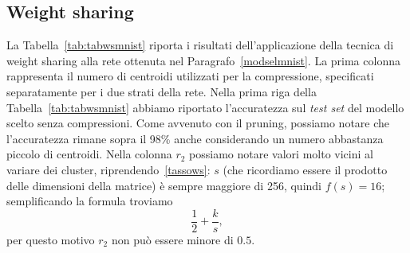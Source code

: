 \documentclass[11pt,a4paper,twoside,
openright]{book}
\begin{document}
\subsection{Weight sharing}
La Tabella~\ref{tab:tabwsmnist} riporta i risultati dell'applicazione della tecnica di weight sharing alla rete ottenuta nel Paragrafo~\ref{modselmnist}. La prima colonna rappresenta il numero di centroidi utilizzati per la compressione, specificati separatamente per i due strati della rete. Nella prima riga della Tabella~\ref{tab:tabwsmnist} abbiamo riportato l'accuratezza sul \textit{test set} del modello scelto senza compressioni. Come avvenuto con il pruning, possiamo notare che l'accuratezza rimane sopra il 98\% anche considerando un numero abbastanza piccolo di centroidi.
Nella colonna $r_2$ possiamo notare valori molto vicini al variare dei cluster, riprendendo~\eqref{tassows}: $s$ (che ricordiamo essere il prodotto delle dimensioni della matrice) è sempre maggiore di 256, quindi $f(s)=16$; semplificando la formula troviamo $$\displaystyle{\frac{1}{2}+\frac{k}{s}},$$ per questo motivo $r_2$ non può essere minore di $0.5$.
\vspace*{\fill}
\end{document}
